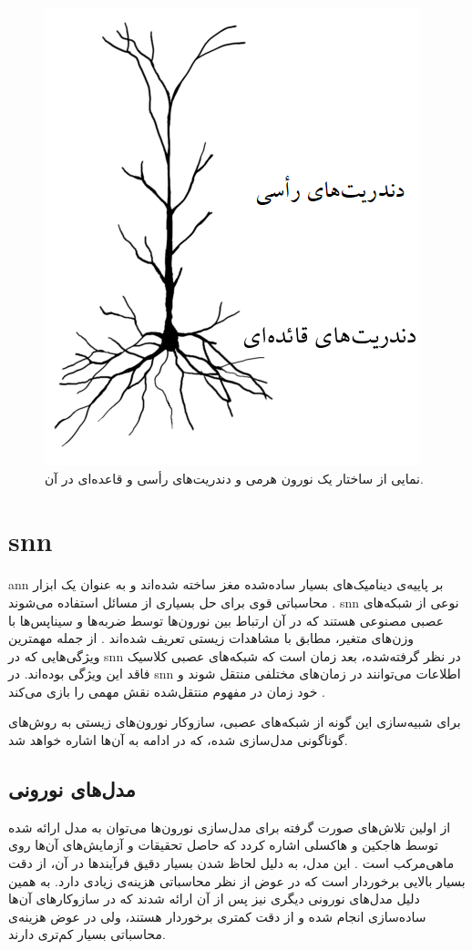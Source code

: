 \documentclass[12pt]{report}
\begin{document}
	\begin{figure}[]
		\centering
		\includegraphics[width=0.5\linewidth]{pyramidal.png}
		\caption[NS]{
			نمایی از ساختار یک نورون هرمی و دندریت‌های رأسی و قاعده‌ای در آن.
		}
		\label{fig:pyramidal}
	\end{figure}
	
	\section{\gls{snn}}
	\gls{ann} بر پاییه‌ی دینامیک‌های بسیار ساده‌شده مغز ساخته شده‌اند و به عنوان یک ابزار محاسباتی قوی برای حل بسیاری از مسائل استفاده می‌شوند
	\cite{TGNN}. 
	\gls{snn} نوعی از شبکه‌های عصبی مصنوعی هستند که در آن ارتباط بین نورون‌ها توسط ضربه‌ها و سیناپس‌ها  با وزن‌های متغیر، مطابق با مشاهدات زیستی تعریف شده‌اند
	\cite{ghosh2009spiking}. 
	از جمله مهمترین ویژگی‌هایی که در \gls{snn} در نظر گرفته‌شده، بعد زمان است
	\cite{Mozafari2019}
	که شبکه‌های عصبی کلاسیک فاقد این ویژگی بوده‌اند. در \gls{snn} اطلاعات می‌توانند در زمان‌های مختلفی منتقل شوند و خود زمان در مفهوم منتقل‌شده نقش مهمی را بازی می‌کند
	\cite{SNN1997}.
	
	برای شبیه‌سازی این گونه از شبکه‌های عصبی، سازوکار نورون‌های زیستی به روش‌‌های گوناگونی مدل‌سازی شده‌، که در ادامه به آن‌ها اشاره خواهد شد.
	
	\subsection{مدل‌های نورونی}
	از اولین تلاش‌های صورت گرفته برای مدل‌سازی نورون‌ها می‌توان به مدل ارائه شده توسط هاجکین و هاکسلی اشاره کردد که حاصل تحقیقات و آزمایش‌های آن‌ها روی ماهی‌مرکب است \cite{Hodgkin1952}. این مدل، به دلیل لحاظ شدن بسیار دقیق فرآیند‌ها در آن، از دقت بسیار بالایی برخوردار است که در عوض از نظر محاسباتی هزینه‌ی زیادی دارد. به همین دلیل مدل‌های نورونی دیگری نیز پس از آن ارائه شدند که در سازوکار‌های آن‌ها ساده‌سازی انجام شده و از دقت کمتری برخوردار هستند، ولی در عوض هزینه‌ی محاسباتی بسیار کم‌تری دارند. 
	
\end{document}
